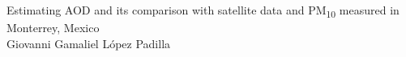 Estimating AOD and its comparison with satellite data and PM\textsubscript{10} measured in Monterrey, Mexico\\

Giovanni Gamaliel López Padilla\\